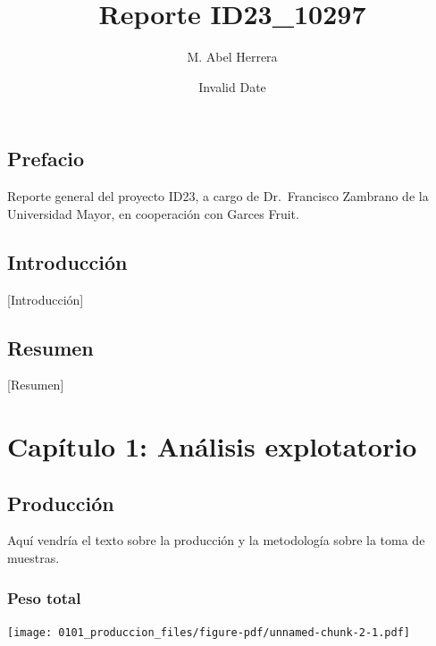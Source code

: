 \documentclass[
  letterpaper,
  DIV=11,
  numbers=noendperiod]{scrreprt}
\title{Reporte ID23\_10297}
\author{M. Abel Herrera}
\date{Invalid Date}
\renewcommand*\contentsname{Tabla de contenidos}
\newcommand\contentsname{Tabla de contenidos}
\begin{document}
\maketitle

\renewcommand*\contentsname{Tabla de contenidos}
{
\hypersetup{linkcolor=}
\setcounter{tocdepth}{2}
\tableofcontents
}

\chapter*{Prefacio}\label{prefacio}


Reporte general del proyecto ID23, a cargo de Dr.~Francisco
Zambrano de la Universidad Mayor, en cooperación con Garces Fruit.


\chapter{Introducción}\label{introducciuxf3n}

{[}Introducción{]}


\chapter{Resumen}\label{resumen}

{[}Resumen{]}

\part{Capítulo 1: Análisis explotatorio}

\chapter{Producción}\label{producciuxf3n}

Aquí vendría el texto sobre la producción y la metodología sobre la toma
de muestras.

\section{Peso total}\label{peso-total}

\begin{center}
\texttt{[image: 0101\_produccion\_files/figure-pdf/unnamed-chunk-2-1.pdf]}
\end{center}
\end{document}
